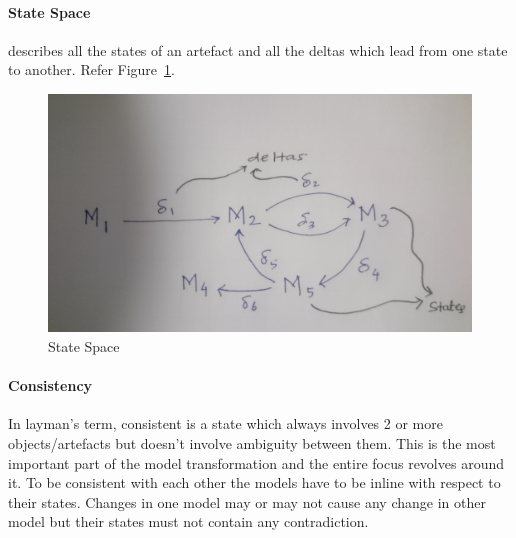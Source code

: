 \paragraph{State Space} describes all the states of an artefact and all the deltas which lead from one state to another. Refer Figure~\ref{fig:StateSpace_Diagram}.
\begin{figure}
	\includegraphics[width=1\textwidth]{figures/State_Space}
	\caption{State Space}
	\label{fig:StateSpace_Diagram}
\end{figure}

\paragraph{Consistency} In layman's term, consistent is a state which always involves 2 or more objects/artefacts but doesn't involve ambiguity between them. This is the most important part of the model transformation and the entire focus revolves around it. To be consistent with each other the models have to be inline with respect to their states. Changes in one model may or may not cause any change in other model but their states must not contain any contradiction. 


